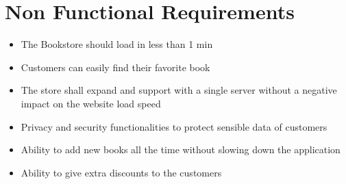 \section{Non Functional Requirements}

\begin{itemize}
\item The Bookstore should load in less than 1 min
\item Customers can easily find their favorite book
\item The store shall expand and support with a single server without a negative impact on the website load speed
\item Privacy and security functionalities to protect sensible data of customers
\item Ability to add new books all the time without slowing down the application
\item Ability to give extra discounts to the customers
\end{itemize}

